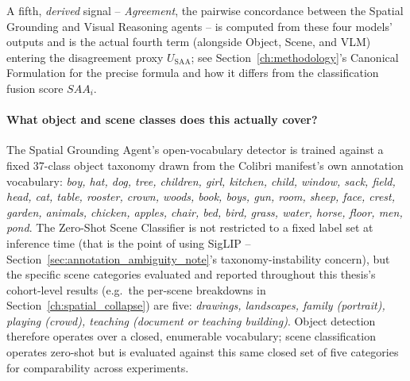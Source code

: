\documentclass[12pt,a4paper]{report}
\begin{document}
\begin{itemize}
\begin{itemize}
    \end{itemize}
    A fifth, \emph{derived} signal -- \textit{Agreement}, the pairwise concordance between the Spatial Grounding and Visual Reasoning agents -- is computed from these four models' outputs and is the actual fourth term (alongside Object, Scene, and VLM) entering the disagreement proxy $U_{\text{SAA}}$; see Section~\ref{ch:methodology}'s Canonical Formulation for the precise formula and how it differs from the classification fusion score $SAA_i$.

    \paragraph{What object and scene classes does this actually cover?} The Spatial Grounding Agent's open-vocabulary detector is trained against a fixed 37-class object taxonomy drawn from the Colibri manifest's own annotation vocabulary: \textit{boy, hat, dog, tree, children, girl, kitchen, child, window, sack, field, head, cat, table, rooster, crown, woods, book, boys, gun, room, sheep, face, crest, garden, animals, chicken, apples, chair, bed, bird, grass, water, horse, floor, men, pond}. The Zero-Shot Scene Classifier is not restricted to a fixed label set at inference time (that is the point of using SigLIP -- Section~\ref{sec:annotation_ambiguity_note}'s taxonomy-instability concern), but the specific scene categories evaluated and reported throughout this thesis's cohort-level results (e.g.\ the per-scene breakdowns in Section~\ref{ch:spatial_collapse}) are five: \textit{drawings, landscapes, family (portrait), playing (crowd), teaching (document or teaching building)}. Object detection therefore operates over a closed, enumerable vocabulary; scene classification operates zero-shot but is evaluated against this same closed set of five categories for comparability across experiments.


\end{itemize}
\end{document}

